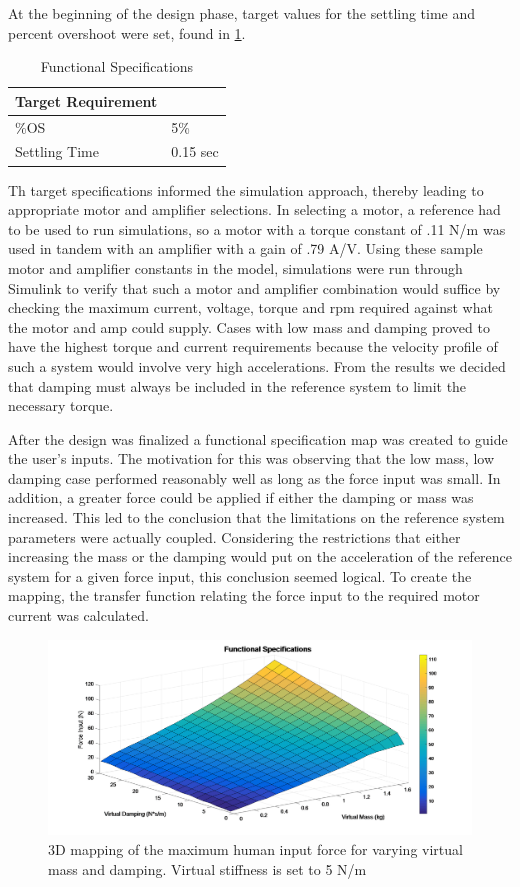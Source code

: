 At the beginning of the design phase, target values for the settling time and percent overshoot were set, found in \ref{specs}.
\begin{table}[H]
	\centering
	\caption{Functional Specifications}
	\label{specs}
	\begin{tabular}{|l|l|}
		\hline
		Target Requirement &          \\ \hline
		\%OS               & 5\%      \\ \hline
		Settling Time      & 0.15 sec \\ \hline
	\end{tabular}
\end{table}
Th target specifications informed the simulation approach, thereby leading to appropriate motor and amplifier selections. In selecting a motor, a reference had to be used to run simulations, so a motor with a torque constant of .11 N/m was used in tandem with an amplifier with a gain of .79 A/V. Using these sample motor and amplifier constants in the model, simulations were run through Simulink to verify that such a motor and amplifier combination would suffice by checking the maximum current, voltage, torque and rpm required against what the motor and amp could supply. Cases with low mass and damping proved to have the highest torque and current requirements because the velocity profile of such a system would involve very high accelerations. From the results we decided that damping must always be included in the reference system to limit the necessary torque. \par
After the design was finalized a functional specification map was created to guide the user's inputs. The motivation for this was observing that the low mass, low damping case performed reasonably well as long as the force input was small. In addition, a greater force could be applied if either the damping or mass was increased. This led to the conclusion that the limitations on the reference system parameters were actually coupled. Considering the restrictions that either increasing the mass or the damping would put on the acceleration of the reference system for a given force input, this conclusion seemed logical. To create the mapping, the transfer function relating the force input to the required motor current was calculated.
\begin{figure}
	\includegraphics[width=1\linewidth]{Images/Functional_Specifications_Mapping}
	\caption{3D mapping of the maximum human input force for varying virtual mass and damping. Virtual stiffness is set to 5 N/m}
	\label{fig:Functional_Specifications_Mapping}
\end{figure}
